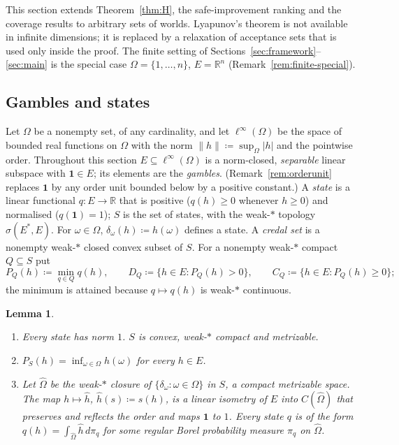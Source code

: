 \documentclass[11pt]{article}
\newcommand{\R}{\mathbb{R}}
\newcommand{\one}{\mathbf{1}}
\theoremstyle{plain}
\newtheorem{lemma}[theorem]{Lemma}
\theoremstyle{definition}
\theoremstyle{remark}
\begin{document}
This section extends Theorem~\ref{thm:H}, the safe-improvement ranking and the coverage
results to arbitrary sets of worlds. Lyapunov's theorem is not available in infinite
dimensions; it is replaced by a relaxation of acceptance sets that is used only inside
the proof. The finite setting of Sections~\ref{sec:framework}--\ref{sec:main} is the
special case $\Omega=\{1,\dots,n\}$, $E=\R^n$ (Remark~\ref{rem:finite-special}).

\subsection{Gambles and states}

Let $\Omega$ be a nonempty set, of any cardinality, and let $\ell^\infty(\Omega)$ be the
space of bounded real functions on $\Omega$ with the norm $\|h\|\coloneqq\sup_\Omega|h|$
and the pointwise order. Throughout this section $E\subseteq\ell^\infty(\Omega)$ is a
norm-closed, \emph{separable} linear subspace with $\one\in E$; its elements are the
\emph{gambles}. (Remark~\ref{rem:orderunit} replaces $\one$ by any order unit bounded
below by a positive constant.) A \emph{state} is a linear functional $q:E\to\R$ that is
positive ($q(h)\ge0$ whenever $h\ge0$) and normalised ($q(\one)=1$); $S$ is the set of
states, with the weak-$\ast$ topology $\sigma(E^\ast,E)$. For $\omega\in\Omega$,
$\delta_\omega(h)\coloneqq h(\omega)$ defines a state. A \emph{credal set} is a nonempty
weak-$\ast$ closed convex subset of $S$. For a nonempty weak-$\ast$ compact $Q\subseteq S$
put
\[
  P_Q(h)\coloneqq\min_{q\in Q}q(h),\qquad D_Q\coloneqq\{h\in E:P_Q(h)>0\},\qquad
  C_Q\coloneqq\{h\in E:P_Q(h)\ge0\};
\]
the minimum is attained because $q\mapsto q(h)$ is weak-$\ast$ continuous.

\begin{lemma}\label{lem:states}
\begin{enumerate}[label=(\alph*)]
  \item Every state has norm $1$. $S$ is convex, weak-$\ast$ compact and metrizable.
  \item $P_S(h)=\inf_{\omega\in\Omega}h(\omega)$ for every $h\in E$.
  \item Let $\hat\Omega$ be the weak-$\ast$ closure of $\{\delta_\omega:\omega\in\Omega\}$
  in $S$, a compact metrizable space. The map $h\mapsto\hat h$, $\hat h(s)\coloneqq s(h)$,
  is a linear isometry of $E$ into $C(\hat\Omega)$ that preserves and reflects the order
  and maps $\one$ to $1$. Every state $q$ is of the form $q(h)=\int_{\hat\Omega}\hat
  h\,d\pi_q$ for some regular Borel probability measure $\pi_q$ on $\hat\Omega$.
\end{enumerate}
\end{lemma}
\end{document}
